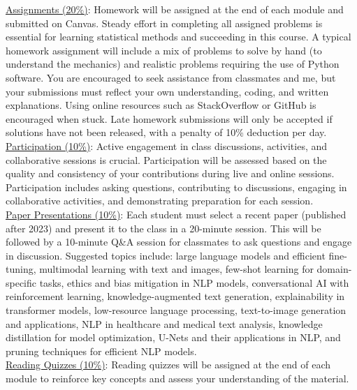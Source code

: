 \documentclass[11pt, a4paper]{article}
\begin{document}
\noindent \underline{Assignments (20\%)}: Homework will be assigned at the end of each module and submitted on Canvas. Steady effort in completing all assigned problems is essential for learning statistical methods and succeeding in this course. A typical homework assignment will include a mix of problems to solve by hand (to understand the mechanics) and realistic problems requiring the use of Python software. You are encouraged to seek assistance from classmates and me, but your submissions must reflect your own understanding, coding, and written explanations. Using online resources such as StackOverflow or GitHub is encouraged when stuck. Late homework submissions will only be accepted if solutions have not been released, with a penalty of 10\% deduction per day.
\vspace{1mm} \\
\noindent \underline{Participation (10\%)}: Active engagement in class discussions, activities, and collaborative sessions is crucial. Participation will be assessed based on the quality and consistency of your contributions during live and online sessions. Participation includes asking questions, contributing to discussions, engaging in collaborative activities, and demonstrating preparation for each session.
\vspace{1mm} \\
\noindent \underline{Paper Presentations (10\%)}: Each student must select a recent paper (published after 2023) and present it to the class in a 20-minute session. This will be followed by a 10-minute Q\&A session for classmates to ask questions and engage in discussion. Suggested topics include: large language models and efficient fine-tuning, multimodal learning with text and images, few-shot learning for domain-specific tasks, ethics and bias mitigation in NLP models, conversational AI with reinforcement learning, knowledge-augmented text generation, explainability in transformer models, low-resource language processing, text-to-image generation and applications, NLP in healthcare and medical text analysis, knowledge distillation for model optimization, U-Nets and their applications in NLP, and pruning techniques for efficient NLP models.
\vspace{1mm} \\
\noindent \underline{Reading Quizzes (10\%)}: Reading quizzes will be assigned at the end of each module to reinforce key concepts and assess your understanding of the material.
\vspace{1mm} \\
\end{document}
